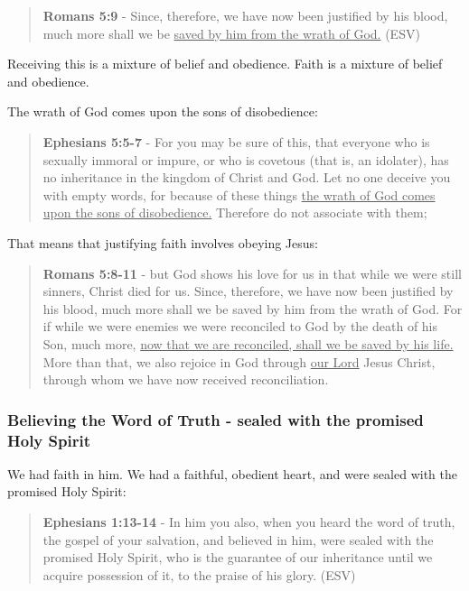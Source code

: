 \documentclass[11pt]{article}
\begin{document}
\begin{quote}
\textbf{Romans 5:9} - Since, therefore, we have now been justified by his blood, much more shall we be \uline{saved by him from the wrath of God.} (ESV)
\end{quote}

Receiving this is a mixture of belief and obedience.
Faith is a mixture of belief and obedience.

The wrath of God comes upon the sons of disobedience:

\begin{quote}
\textbf{Ephesians 5:5-7} - For you may be sure of this, that everyone who is sexually immoral or impure, or who is covetous (that is, an idolater), has no inheritance in the kingdom of Christ and God. Let no one deceive you with empty words, for because of these things \uline{the wrath of God comes upon the sons of disobedience.} Therefore do not associate with them;
\end{quote}

That means that justifying faith involves obeying Jesus:

\begin{quote}
\textbf{Romans 5:8-11} - but God shows his love for us in that while we were still sinners, Christ died for us. Since, therefore, we have now been justified by his blood, much more shall we be saved by him from the wrath of God. For if while we were enemies we were reconciled to God by the death of his Son, much more, \uline{now that we are reconciled, shall we be saved by his life.} More than that, we also rejoice in God through \uline{our Lord} Jesus Christ, through whom we have now received reconciliation.
\end{quote}

\subsubsection{Believing the Word of Truth - sealed with the promised Holy Spirit}
\label{sec:org1b07bb5}
We had faith in him. We had a faithful, obedient heart, and were sealed with the promised Holy Spirit:

\begin{quote}
\textbf{Ephesians 1:13-14} - In him you also, when you heard the word of truth, the gospel of your salvation, and believed in him, were sealed with the promised Holy Spirit, who is the guarantee of our inheritance until we acquire possession of it, to the praise of his glory. (ESV)
\end{quote}
\end{document}
